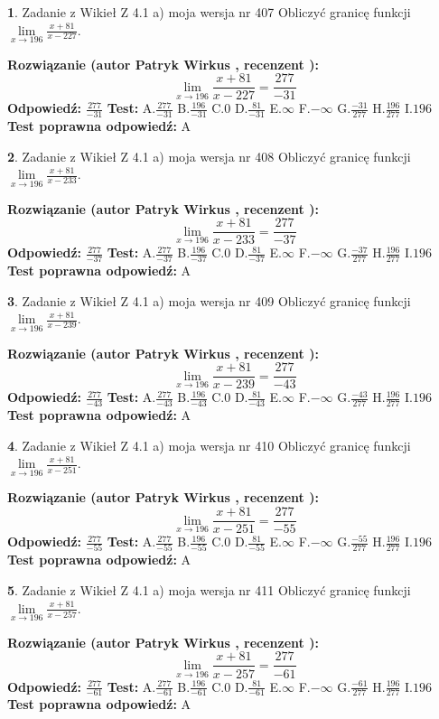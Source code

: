 \documentclass[12pt, a4paper]{article}
\theoremstyle{definition} %
\newtheorem{zad}{}
\newcommand{\zadStart}[1]{\begin{zad}#1\newline}
\newcommand{\zadStop}{\end{zad}}
\newcommand{\rozwStart}[2]{\noindent \textbf{Rozwiązanie (autor #1 , recenzent #2): }\newline}
\newcommand{\rozwStop}{\newline}
\newcommand{\odpStart}{\noindent \textbf{Odpowiedź:}\newline}
\newcommand{\odpStop}{\newline}
\newcommand{\testStart}{\noindent \textbf{Test:}\newline}
\newcommand{\testStop}{\newline}
\newcommand{\kluczStart}{\noindent \textbf{Test poprawna odpowiedź:}\newline}
\newcommand{\kluczStop}{\newline}
\begin{document}
\zadStart{Zadanie z Wikieł Z 4.1 a) moja wersja nr 407}
Obliczyć granicę funkcji $\lim\limits_{x\to196}\frac{x+81}{x-227}$.
\zadStop
\rozwStart{Patryk Wirkus}{}
$$\lim\limits_{x\to196}\frac{x+81}{x-227} = \frac{277}{-31}$$
\rozwStop
\odpStart
$\frac{277}{-31}$
\odpStop
\testStart
A.$\frac{277}{-31}$
B.$\frac{196}{-31}$
C.$0$
D.$\frac{81}{-31}$
E.$\infty$
F.$-\infty$
G.$\frac{-31}{277}$
H.$\frac{196}{277}$
I.$196$
\testStop
\kluczStart
A
\kluczStop



\zadStart{Zadanie z Wikieł Z 4.1 a) moja wersja nr 408}
Obliczyć granicę funkcji $\lim\limits_{x\to196}\frac{x+81}{x-233}$.
\zadStop
\rozwStart{Patryk Wirkus}{}
$$\lim\limits_{x\to196}\frac{x+81}{x-233} = \frac{277}{-37}$$
\rozwStop
\odpStart
$\frac{277}{-37}$
\odpStop
\testStart
A.$\frac{277}{-37}$
B.$\frac{196}{-37}$
C.$0$
D.$\frac{81}{-37}$
E.$\infty$
F.$-\infty$
G.$\frac{-37}{277}$
H.$\frac{196}{277}$
I.$196$
\testStop
\kluczStart
A
\kluczStop



\zadStart{Zadanie z Wikieł Z 4.1 a) moja wersja nr 409}
Obliczyć granicę funkcji $\lim\limits_{x\to196}\frac{x+81}{x-239}$.
\zadStop
\rozwStart{Patryk Wirkus}{}
$$\lim\limits_{x\to196}\frac{x+81}{x-239} = \frac{277}{-43}$$
\rozwStop
\odpStart
$\frac{277}{-43}$
\odpStop
\testStart
A.$\frac{277}{-43}$
B.$\frac{196}{-43}$
C.$0$
D.$\frac{81}{-43}$
E.$\infty$
F.$-\infty$
G.$\frac{-43}{277}$
H.$\frac{196}{277}$
I.$196$
\testStop
\kluczStart
A
\kluczStop



\zadStart{Zadanie z Wikieł Z 4.1 a) moja wersja nr 410}
Obliczyć granicę funkcji $\lim\limits_{x\to196}\frac{x+81}{x-251}$.
\zadStop
\rozwStart{Patryk Wirkus}{}
$$\lim\limits_{x\to196}\frac{x+81}{x-251} = \frac{277}{-55}$$
\rozwStop
\odpStart
$\frac{277}{-55}$
\odpStop
\testStart
A.$\frac{277}{-55}$
B.$\frac{196}{-55}$
C.$0$
D.$\frac{81}{-55}$
E.$\infty$
F.$-\infty$
G.$\frac{-55}{277}$
H.$\frac{196}{277}$
I.$196$
\testStop
\kluczStart
A
\kluczStop



\zadStart{Zadanie z Wikieł Z 4.1 a) moja wersja nr 411}
Obliczyć granicę funkcji $\lim\limits_{x\to196}\frac{x+81}{x-257}$.
\zadStop
\rozwStart{Patryk Wirkus}{}
$$\lim\limits_{x\to196}\frac{x+81}{x-257} = \frac{277}{-61}$$
\rozwStop
\odpStart
$\frac{277}{-61}$
\odpStop
\testStart
A.$\frac{277}{-61}$
B.$\frac{196}{-61}$
C.$0$
D.$\frac{81}{-61}$
E.$\infty$
F.$-\infty$
G.$\frac{-61}{277}$
H.$\frac{196}{277}$
I.$196$
\testStop
\kluczStart
A
\kluczStop
\end{document}
